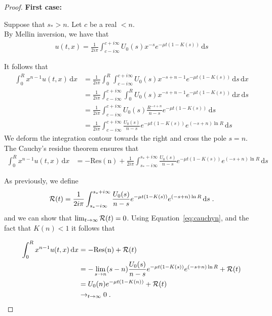 \documentclass[11pt]{amsart}
\newcommand{\diff}{\,\mathrm{d}}
\begin{document}
\begin{proof}
\textbf{First case:}

Suppose that $s_* > n$. Let $c$ be a real $<n$. \\
    By Mellin inversion, we have that
    \begin{align*}
        u(t,x) = \frac{1}{2i\pi}\int_{c-i\infty}^{c+i\infty} U_0(s) x^{-s} e^{-\mu t(1 - K(s))} \diff s
    \end{align*}

It follows that
\begin{align*}
    \int_0^R x^{n-1}u(t,x) \diff x 
    &= \frac{1}{2i\pi} \int_0^R \int_{c-i\infty}^{c+i\infty} U_0(s) x^{-s+n-1} e^{-\mu t(1 - K(s))} \diff s \diff x \\
    &= \frac{1}{2i\pi} \int_{c-i\infty}^{c+i\infty} \int_0^R U_0(s) x^{-s+n-1} e^{-\mu t(1 - K(s))} \diff x \diff s \\
    &= \frac{1}{2i\pi} \int_{c-i\infty}^{c+i\infty} U_0(s) \frac{R^{-s+n}}{n-s} e^{-\mu t(1 - K(s))} \diff s \\
    &= \frac{1}{2i\pi} \int_{c-i\infty}^{c+i\infty} \frac{U_0(s)}{n-s} e^{-\mu t(1 - K(s))} e^{(-s+n)\ln R} \diff s
\end{align*}
We deform the integration contour towards the right and cross the pole $s = n$. The Cauchy's residue theorem ensures that
\begin{align}
    \int_0^R x^{n-1}u(t,x) \diff x &= -\mathrm{Res(n)} + \frac{1}{2i\pi} \int_{s_*-i\infty}^{s_*+i\infty} \frac{U_0(s)}{n-s} e^{-\mu t(1 - K(s))} e^{(-s+n)\ln R} \diff s 
    \label{eq:cauchyn}
\end{align}


As previously, we define
\begin{align*}
    \Rcal(t) = \frac{1}{2i\pi} \int_{s_*-i\infty}^{s_*+i\infty} \frac{U_0(s)}{n-s} e^{-\mu t(1 - K(s))} e^{(-s+n)\ln R} \diff s
    \eqfinp
\end{align*}
and we can show that $\lim_{t\to\infty}\mathcal{R}(t) = 0$. Using Equation~\ref{eq:cauchyn}, and the fact that $K(n) < 1$ it follows that 


\begin{align*}
    \int_0^R x^{n-1}u(t,x) \diff x &= -\mathrm{Res(n)} + \Rcal(t) \\
    &= -\lim_{s \to n} (s-n)\frac{U_0(s)}{n-s} e^{-\mu t(1 - K(s))} e^{(-s+n)\ln R}  + \Rcal(t)\\
    &= U_0(n)e^{-\mu t(1 - K(n))} + \Rcal(t)\\
    &\to_{t \to \infty} 0
    \eqfinp
\end{align*}


\end{proof}
\end{document}

